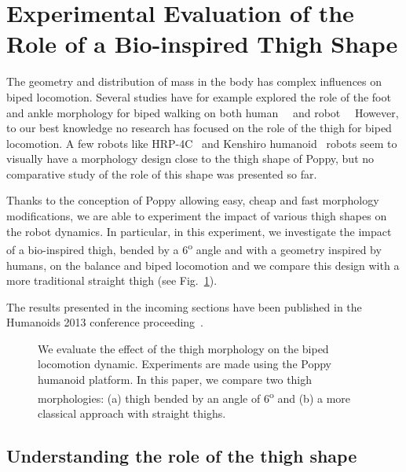 
\section{Experimental Evaluation of the Role of a Bio-inspired Thigh Shape} %
\label{sec:experimental_thigh_shape}

The geometry and distribution of mass in the body has complex influences on biped locomotion. Several studies have for example explored the role of the foot and ankle morphology for biped walking on both human~\cite{Adamczyk2006}~\cite{Hughes1990} and robot~\cite{hobbelen2005ankle}~\cite{Davis2010} However, to our best knowledge no research has focused on the role of the thigh for biped locomotion.  A few robots like HRP-4C~\cite{kaneko2009cybernetic} and Kenshiro humanoid~\cite{nakanishi2013design} robots seem to visually have a morphology design close to the thigh shape of Poppy, but no comparative study of the role of this shape was presented so far.

Thanks to the conception of Poppy allowing easy, cheap and fast morphology modifications, we are able to experiment the impact of various thigh shapes on the robot dynamics. In particular, in this experiment, we investigate the impact of a bio-inspired thigh, bended by a 6\textsuperscript{o} angle and with a geometry inspired by humans, on the balance and biped locomotion and we compare this design with a more traditional straight thigh (see Fig.~\ref{fig:poppy_compared}).

The results presented in the incoming sections have been published in the Humanoids 2013 conference proceeding~\cite{lapeyre:hal-00861110}.


\begin{figure}[!t]
\centering
    \hfil
    \caption{We evaluate the effect of the thigh morphology on the biped locomotion dynamic.
    Experiments are made using the Poppy humanoid platform.
    In this paper, we compare two thigh morphologies: (a) thigh bended by an angle of 6\textsuperscript{o} and (b) a more classical approach with straight thighs.}
    \label{fig:poppy_compared}
\end{figure}


\subsection{Understanding the role of the thigh shape} %

